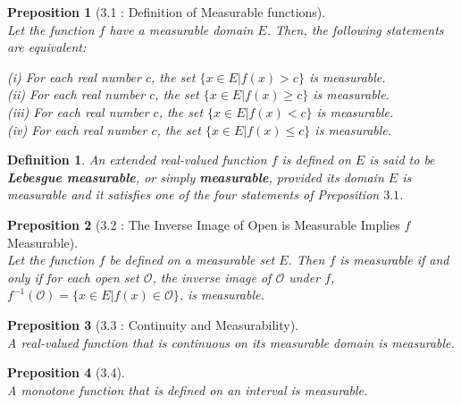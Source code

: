 \documentclass{article} %
\theoremstyle{quest}
\newtheorem*{definition}{Definition}
\newtheorem*{preposition}{Preposition}
\begin{document}
\bigskip

\begin{preposition}[3.1 : Definition of Measurable functions] ~\\
Let the function $f$ have a measurable domain $E$. Then, the following
statements are equivalent: \\
\begin{center}
\textit{(i)} For each real number $c$, the set $\{ x \in E | f(x) > c \}$ is measurable. \\
\textit{(ii)} For each real number $c$, the set $\{ x \in E | f(x) \geq c \}$ is measurable. \\
\textit{(iii)} For each real number $c$, the set $\{ x \in E | f(x) < c \}$ is measurable. \\
\textit{(iv)} For each real number $c$, the set $\{ x \in E | f(x) \leq c \}$ is measurable.\\
\end{center}
\end{preposition}

\bigskip

\begin{definition}
An extended real-valued function $f$ is defined on $E$ is said to be \textbf{Lebesgue measurable},
or simply \textbf{measurable}, provided its domain $E$ is measurable and it satisfies one of the
four statements of Preposition $3.1$.
\end{definition}

\bigskip

\begin{preposition}[3.2 : The Inverse Image of Open is Measurable Implies $f$ Measurable] ~\\ 
Let the function $f$ be defined on a measurable set $E$. Then $f$ is measurable if and only if
for each open set $\mathcal{O}$, the inverse image of $\mathcal{O}$ under $f$, $f^{-1}(\mathcal{O})
= \{ x \in E | f(x) \in \mathcal{O} \}$, is measurable.
\end{preposition}

\bigskip 

\begin{preposition}[3.3 : Continuity and Measurability] ~\\ 
A real-valued function that is continuous on its measurable domain is measurable.
\end{preposition}

\bigskip

\begin{preposition}[3.4] ~\\
A monotone function that is defined on an interval is measurable.
\end{preposition}
\end{document}
